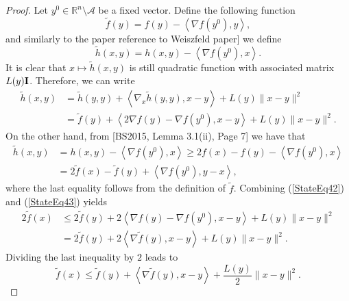 \documentclass[11pt]{article}
\numberwithin{equation}{section}
\begin{document}
\begin{proof}
Let $y^0 \in \mathbb{R}^n \setminus \mathcal{A}$ be a fixed vector. Define the following function
\begin{equation*}
	\widetilde{f}(y) = f(y) - \left\langle \nabla f(y^0), y \right\rangle ,
\end{equation*}
and similarly to the paper reference to Weiszfeld paper] we define
 \begin{equation*}
	\widetilde{h}(x,y) = h(x,y) - \left\langle \nabla f(y^0), x \right\rangle .
\end{equation*}
It is clear that $x \mapsto \widetilde{h}(x,y)$ is still quadratic function with associated matrix $L(y)\bf{I}$. Therefore, we can write
\begin{equation}
\begin{aligned}
	\widetilde{h}(x,y) &= \widetilde{h}(y,y) + \left\langle \nabla_x \widetilde{h}(y,y), x-y \right\rangle + L(y) \|x-y\|^2 \\
	&= \widetilde{f}(y) + \left\langle 2\nabla f(y) - \nabla f(y^0), x-y \right\rangle + L(y) \|x-y\|^2.	\label{StateEq42}
\end{aligned}
\end{equation}
On the other hand, from [BS2015, Lemma 3.1(ii), Page 7] we have that
\begin{equation}
\begin{aligned}
	\widetilde{h}(x,y) &= h(x,y) - \left\langle	\nabla f(y^0),x \right\rangle \geq 2f(x) - f(y) - \left\langle \nabla f(y^0),x \right\rangle \\
	&= 2 \widetilde{f}(x) - \widetilde{f}(y) + \left\langle \nabla f(y^0), y-x \right\rangle, \label{StateEq43}
\end{aligned}
\end{equation}
where the last equality follows from the definition of $\widetilde{f}$. Combining (\ref{StateEq42}) and (\ref{StateEq43}) yields
\begin{equation*}
\begin{aligned}
	2\widetilde{f}(x) &\leq 2\widetilde{f}(y) + 2 \left\langle \nabla f(y) - \nabla f(y^0), x-y \right\rangle + L(y) \|x-y\|^2 \\
	&= 2\widetilde{f}(y) + 2 \left\langle \nabla \widetilde{f}(y), x-y \right\rangle + L(y) \|x-y\|^2.
\end{aligned}
\end{equation*}
Dividing the last inequality by $2$ leads to
\begin{equation}
	\widetilde{f}(x) \leq \widetilde{f}(y) + \left\langle \nabla \widetilde{f}(y), x-y \right\rangle + \frac{L(y)}{2} \|x-y\|^2. \label{StateEq44}

\end{equation}
\end{proof}
\end{document}
